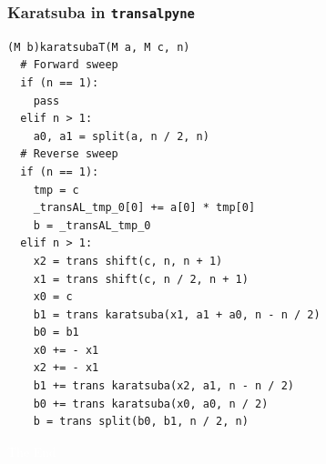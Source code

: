 \documentclass[10pt]{beamer}
\newcommand{\tALpy}{\texttt{transalpyne}}
\begin{document}

\begin{frame}[fragile]
  \frametitle{Karatsuba in \tALpy}

  \lstset{basicstyle=\ttfamily\footnotesize}
\begin{lstlisting}
(M b)karatsubaT(M a, M c, n)
  # Forward sweep
  if (n == 1):
    pass
  elif n > 1:
    a0, a1 = split(a, n / 2, n)
  # Reverse sweep
  if (n == 1):
    tmp = c
    _transAL_tmp_0[0] += a[0] * tmp[0]
    b = _transAL_tmp_0
  elif n > 1:
    x2 = trans shift(c, n, n + 1)
    x1 = trans shift(c, n / 2, n + 1)
    x0 = c
    b1 = trans karatsuba(x1, a1 + a0, n - n / 2)
    b0 = b1
    x0 += - x1
    x2 += - x1
    b1 += trans karatsuba(x2, a1, n - n / 2)
    b0 += trans karatsuba(x0, a0, n / 2)
    b = trans split(b0, b1, n / 2, n)
\end{lstlisting}
\end{frame}


{
  \begin{frame}[plain]
    \vspace{8cm}
    \begin{center}
      \textcolor{white}{\Huge The End}
    \end{center}
  \end{frame}
}

\end{document}
